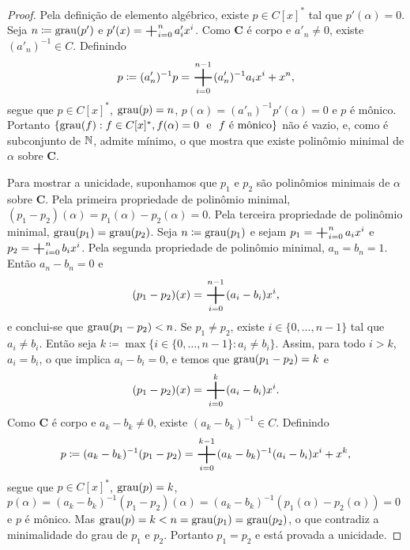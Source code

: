 \begin{proof}
	Pela definição de elemento algébrico, existe $p \in C[x]^*$ tal que $p'(\alpha)=0$. Seja $n \coloneqq \operatorname{grau}(p')$ e $p'(x) = \bigplus_{i=0}^n a'_ix^i$. Como $\bm C$ é corpo e $a'_n \neq 0$, existe $(a'_n)^{-1} \in C$. Definindo
	\begin{equation*}
	p \coloneqq (a'_n)^{-1}p = \bigplus_{i=0}^{n-1} (a'_n)^{-1}a_ix^i + x^n,
	\end{equation*}
segue que $p \in C[x]^*$, $\operatorname{grau}(p)=n$, $p(\alpha) = (a'_n)^{-1}p'(\alpha)=0$ e $p$ é mônico. Portanto $\{\operatorname{grau}(f) : f \in C[x]^*, f(\alpha)=0 \text{\ \ e\ \ } f \text{\ é mônico}\}$ não é vazio, e, como é subconjunto de $\mathbb{N}$, admite mínimo, o que mostra que existe polinômio minimal de $\alpha$ sobre $\bm C$.

	Para mostrar a unicidade, suponhamos que $p_1$ e $p_2$ são polinômios minimais de $\alpha$ sobre $\bm C$. Pela primeira propriedade de polinômio minimal, $(p_1-p_2)(\alpha)=p_1(\alpha)-p_2(\alpha)=0$. Pela terceira propriedade de polinômio minimal, $\operatorname{grau}(p_1)=\operatorname{grau}(p_2)$. Seja $n \coloneqq \operatorname{grau}(p_1)$ e sejam $p_1 = \bigplus_{i=0}^n a_ix^i$ e $p_2 = \bigplus_{i=0}^n b_ix^i$. Pela segunda propriedade de polinômio minimal, $a_n=b_n=1$. Então $a_n-b_n=0$ e
	\begin{equation*}
	(p_1-p_2)(x) = \bigplus_{i=0}^{n-1} (a_i-b_i)x^i,
	\end{equation*}
e conclui-se que $\operatorname{grau}(p_1-p_2) < n$. Se $p_1 \neq p_2$, existe $i \in \{0,\ldots,n-1\}$ tal que $a_i \neq b_i$. Então seja $k \coloneqq \max\{i \in \{0,\ldots,n-1\} : a_i \neq b_i\}$. Assim, para todo $i > k$, $a_i = b_i$, o que implica $a_i-b_i=0$, e temos que $\operatorname{grau}(p_1-p_2)=k$ e
	\begin{equation*}
	(p_1-p_2)(x) = \bigplus_{i=0}^{k} (a_i-b_i)x^i.
	\end{equation*}
Como $\bm C$ é corpo e $a_k-b_k \neq 0$, existe $(a_k-b_k)^{-1} \in C$. Definindo
	\begin{equation*}
	p \coloneqq (a_k-b_k)^{-1}(p_1-p_2) = \bigplus_{i=0}^{k-1} (a_k-b_k)^{-1}(a_i-b_i)x^i + x^k,
	\end{equation*}
 segue que $p \in C[x]^*$, $\operatorname{grau}(p)=k$, $p(\alpha)=(a_k-b_k)^{-1}(p_1-p_2)(\alpha)=(a_k-b_k)^{-1}(p_1(\alpha)-p_2(\alpha))=0$ e $p$ é mônico. Mas $\operatorname{grau}(p) = k < n = \operatorname{grau}(p_1) = \operatorname{grau}(p_2)$, o que contradiz a minimalidade do grau de $p_1$ e $p_2$. Portanto $p_1=p_2$ e está provada a unicidade.
\end{proof}

